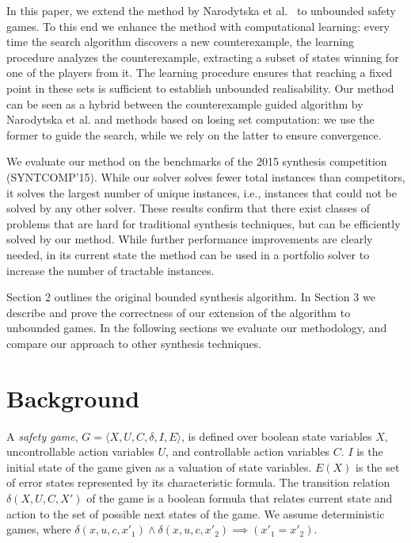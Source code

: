 \documentclass{llncs}
\begin{document}

In this paper, we extend the method by Narodytska et al.~\cite{narodytska2014} to unbounded 
safety games.  To this end we enhance the method with computational learning: every time
the search algorithm discovers a new counterexample, the learning procedure analyzes the 
counterexample, extracting a subset of states winning for one of the players from it.  
The learning procedure ensures that reaching a fixed point in these sets is sufficient to establish 
unbounded realisability.
Our method can be seen as a hybrid between the counterexample guided algorithm
by Narodytska et al. and methods based on losing set computation: we use the
former to guide the search, while we rely on the latter to ensure convergence.

We evaluate our method on the benchmarks of the 2015 synthesis competition
(SYNTCOMP'15).  While our solver solves fewer total instances than competitors,
it solves the largest number of unique instances, i.e., instances that could not be solved by 
any other solver.  These results confirm that there exist classes of problems that are
hard for traditional synthesis techniques, but can be efficiently solved by our method.
While further performance improvements are clearly needed, in its current state the method 
can be used in a portfolio solver to increase the number of tractable instances.

Section 2 outlines the original bounded synthesis algorithm. In Section 3 we
describe and prove the correctness of our extension of the algorithm to
unbounded games. In the following sections we evaluate our methodology, and
compare our approach to other synthesis techniques.

\section{Background}

A \emph{safety game}, $G = \langle X, U, C, \delta, I, E \rangle$, is defined
over boolean state variables $X$, uncontrollable action variables $U$, and
controllable action variables $C$.  $I$ is the initial state of the game given
as a valuation of state variables.  $E(X)$ is the set of error states
represented by its characteristic formula.  The transition relation $\delta(X,
U, C, X')$ of the game is a boolean formula that relates current state and
action to the set of possible next states of the game.  We assume deterministic
games, where $\delta(x,u,c,x'_1) \land \delta(x,u,c,x'_2) \implies
(x'_1=x'_2)$.
\end{document}

